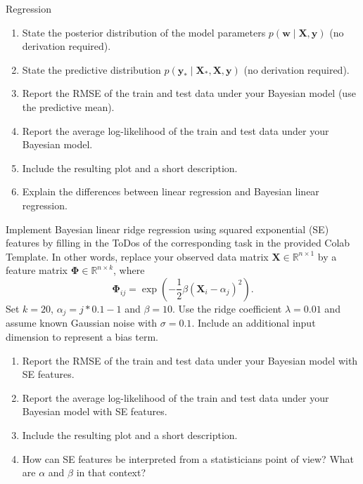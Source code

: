 \documentclass[
	english,
        solution=true
	]{tudaexercise}
\begin{document}
\begin{task}[points=34]{Regression}
\begin{subtask}[points=10, title=Bayesian Linear Regression]
\begin{enumerate}
\item State the posterior distribution of the model parameters $p(\mathbf{w} \mid \mathbf{X}, \mathbf{y})$ (no derivation required). 
\item State the predictive distribution $p(\mathbf{y}_* \mid \mathbf{X}_*, \mathbf{X}, \mathbf{y})$ (no derivation required). 
\item Report the RMSE of the train and test data under your Bayesian model (use the predictive mean). 
\item Report the average log-likelihood of the train and test data under your Bayesian model.
\item Include the resulting plot and a short description. 
\item Explain the differences between linear regression and Bayesian linear regression.
\end{enumerate}

\begin{solution}

\end{solution}
\end{subtask}

 \newpage
\begin{subtask}[points=8, title=Squared Exponential Features]
Implement Bayesian linear ridge regression using squared exponential (SE) features by filling in the ToDos of the corresponding task in the provided Colab Template.
In other words, replace your observed data matrix $\mathbf{X} \in \mathbb{R}^{n \times 1}$ by a feature matrix $\bm{\Phi} \in \mathbb{R}^{n \times k}$,
where
\begin{equation*}
\bm{\Phi}_{ij} = \exp \left( -\frac{1}{2} \beta (\mathbf{X}_i - \alpha_j)^2 \right).
\end{equation*}
Set $k = 20$, $\alpha_j = j * 0.1 - 1$ and $\beta = 10$. Use the ridge coefficient $\lambda = 0.01$ and assume known Gaussian noise with $\sigma = 0.1$.
Include an additional input dimension to represent a bias term.

\begin{enumerate}
\item Report the RMSE of the train and test data under your Bayesian model with SE features. 
\item Report the average log-likelihood of the train and test data under your Bayesian model with SE features. 
\item Include the resulting plot and a short description. 
\item How can SE features be interpreted from a statisticians point of view? What are $\alpha$ and $\beta$ in that context? 
\end{enumerate}

\begin{solution}

\end{solution}
\end{subtask}
\end{task}
\end{document}
